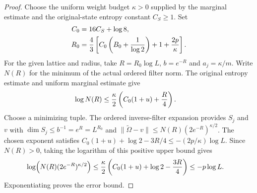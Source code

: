 \begin{proof}
    Choose the uniform weight budget $\kappa>0$ supplied by the marginal
    estimate and the original-state entropy constant $C_S\ge1$. Set
    \begin{align}
        C_0 & =16C_S+\log8, \notag                            \\
        R_0 & =\frac43\left[C_0\left(B_0+\frac1{\log2}\right)
            +1+\frac{2p}{\kappa}\right]. \notag
    \end{align}
    For the given lattice and radius, take $R=R_0\log L$, $b=e^{-R}$
    and $a_j=\kappa/m$. Write $N(R)$ for the minimum of the actual ordered
    filter norm. The original entropy estimate and uniform marginal
    estimate give
    \begin{align}
        \log N(R) & \le \frac\kappa2\left(C_0(1+u)+\frac R4\right). \notag
    \end{align}
    Choose a minimizing tuple. The ordered inverse-filter expansion
    provides $S_j$ and $v$ with
    $\dim S_j\le b^{-1}=e^R=L^{R_0}$ and
    $\|\widetilde\Omega-v\|\le N(R)(2e^{-R})^{\kappa/2}$.
    The chosen exponent satisfies
    $C_0(1+u)+\log2-3R/4\le-(2p/\kappa)\log L$.
    Since $N(R)>0$, taking the logarithm of this positive upper bound gives
    \begin{align}
        \log\!\left(N(R)(2e^{-R})^{\kappa/2}\right)
         & \le \frac\kappa2\left(C_0(1+u)+\log2-\frac{3R}4\right)
        \le-p\log L. \notag
    \end{align}
    Exponentiating proves the error bound.
\end{proof}

